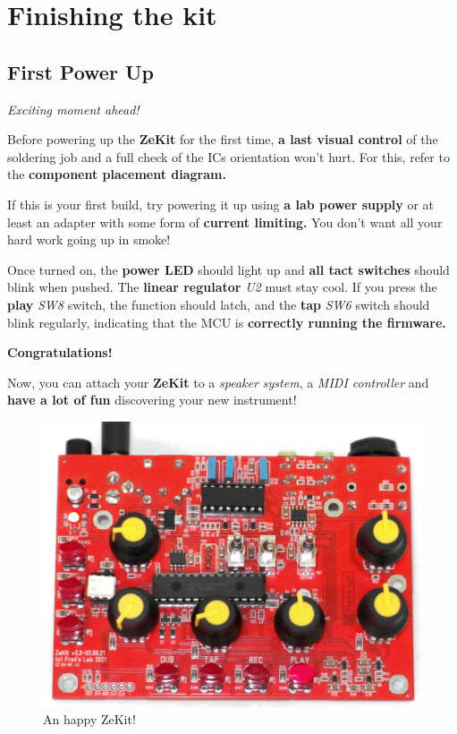 \documentclass{scrartcl}
\begin{document}
\pagebreak
\section{Finishing the kit}

\subsection{First Power Up}
\Large
\emph{Exciting moment ahead!}
\normalsize

Before powering up the \textbf{ZeKit} for the first time, \textbf{a last visual control} of the soldering job and a full check of the ICs orientation won't hurt.
For this, refer to the \textbf{component placement diagram.}

If this is your first build, try powering it up using \textbf{a lab power supply} or at least an adapter with some form of \textbf{current limiting.}
You don't want all your hard work going up in smoke!

Once turned on, the \textbf{power LED} should light up and \textbf{all tact switches} should blink when pushed. The \textbf{linear regulator} \emph{U2} must stay cool.
If you press the \textbf{play} \emph{SW8} switch, the function should latch, and the \textbf{tap} \emph{SW6} switch should blink regularly, indicating that the MCU is \textbf{correctly running the firmware.}

\vspace{0.5cm}
\textbf{Congratulations!}

Now, you can attach your \textbf{ZeKit} to a \emph{speaker system}, a \emph{MIDI controller} and \textbf{have a lot of fun} discovering your new instrument!

\begin{figure}[!ht]
    \begin{center}
        \includegraphics[scale=0.28]{assets/zekit-happy.jpg}
        \caption{An happy ZeKit!}
    \end{center}
\end{figure}
\end{document}
